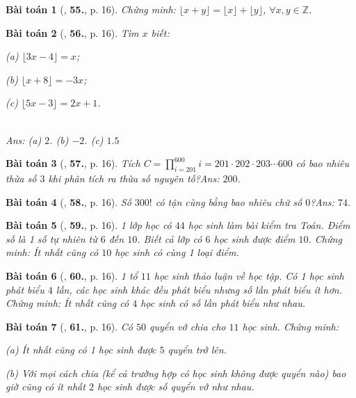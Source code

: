 \documentclass{article}
\numberwithin{equation}{section}
\newtheorem{baitoan}{Bài toán}
\begin{document}
\begin{baitoan}[\cite{Tuyen_Toan_7}, \textbf{55.}, p. 16]
	Chứng minh: $\lfloor x + y\rfloor = \lfloor x\rfloor + \lfloor y\rfloor$, $\forall x,y\in\mathbb{Z}$.
\end{baitoan}

\begin{baitoan}[\cite{Tuyen_Toan_7}, \textbf{56.}, p. 16]
	Tìm $x$ biết:
	\begin{enumerate*}
		\item[(a)] $\lfloor 3x - 4\rfloor = x$;
		\item[(b)] $\lfloor x + 8\rfloor = -3x$;
		\item[(c)] $\lfloor 5x - 3\rfloor = 2x + 1$.
	\end{enumerate*}\\\mbox{}\hfill\textsf{Ans:} (a) $2$. (b) $-2$. (c) $1.5$
\end{baitoan}

\begin{baitoan}[\cite{Tuyen_Toan_7}, \textbf{57.}, p. 16]
	Tích $C = \prod_{i=201}^{600} i = 201\cdot202\cdot203\cdots600$ có bao nhiêu thừa số $3$ khi phân tích ra thừa số nguyên tố?\hfill\textsf{Ans:} $200$.
\end{baitoan}

\begin{baitoan}[\cite{Tuyen_Toan_7}, \textbf{58.}, p. 16]
	Số $300!$ có tận cùng bằng bao nhiêu chữ số $0$?\hfill\textsf{Ans:} $74$.
\end{baitoan}

\begin{baitoan}[\cite{Tuyen_Toan_7}, \textbf{59.}, p. 16]
	1 lớp học có $44$ học sinh làm bài kiểm tra Toán. Điểm số là 1 số tự nhiên từ $6$ đến $10$. Biết cả lớp có $6$ học sinh được điểm $10$. Chứng minh: Ít nhất cũng có $10$ học sinh có cùng 1 loại điểm.
\end{baitoan}

\begin{baitoan}[\cite{Tuyen_Toan_7}, \textbf{60.}, p. 16]
	1 tổ $11$ học sinh thảo luận về học tập. Có 1 học sinh phát biểu $4$ lần, các học sinh khác đều phát biểu nhưng số lần phát biểu ít hơn. Chứng minh: Ít nhất cũng có $4$ học sinh có số lần phát biểu như nhau.
\end{baitoan}

\begin{baitoan}[\cite{Tuyen_Toan_7}, \textbf{61.}, p. 16]
	Có $50$ quyển vở chia cho $11$ học sinh. Chứng minh:
	\begin{enumerate*}
		\item[(a)] Ít nhất cũng có 1 học sinh được $5$ quyển trở lên.
		\item[(b)] Với mọi cách chia (kể cả trường hợp có học sinh không được quyển nào) bao giờ cũng có ít nhất $2$ học sinh được số quyển vở như nhau.
	\end{enumerate*}
\end{baitoan}
\end{document}
